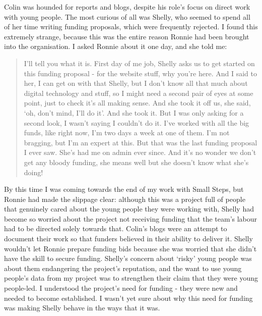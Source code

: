 Colin was hounded for reports and blogs, despite his role's focus on direct work with young people. The most curious of all was Shelly, who seemed to spend all of her time writing funding proposals, which were frequently rejected. I found this extremely strange, because this was the entire reason Ronnie had been brought into the organisation. I asked Ronnie about it one day, and she told me:
\begin{quote}
I'll tell you what it is. First day of me job, Shelly asks us to get started on this funding proposal - for the website stuff, why you're here. And I said to her, I can get on with that Shelly, but I don't know all that much about digital technology and stuff, so I might need a second pair of eyes at some point, just to check it's all making sense. And she took it off us, she said, `oh, don't mind, I'll do it'. And she took it. But I was only asking for a second look, I wasn't saying I couldn't do it. I've worked with all the big funds, like right now, I'm two days a week at one of them. I'm not bragging, but I'm an expert at this. But that was the last funding proposal I ever saw. She's had me on admin ever since. And it's no wonder we don't get any bloody funding, she means well but she doesn't know what she's doing!
\end{quote}

By this time I was coming towards the end of my work with Small Steps, but Ronnie had made the slippage clear: although this was a project full of people that genuinely cared about the young people they were working with, Shelly had become so worried about the project not receiving funding that the team's labour had to be directed solely towards that. Colin's blogs were an attempt to document their work so that funders believed in their ability to deliver it. Shelly wouldn't let Ronnie prepare funding bids because she was worried that she didn't have the skill to secure funding. Shelly's concern about `risky' young people was about them endangering the project's reputation, and the want to use young people's data from my project was to strengthen their claim that they were young people-led. I understood the project's need for funding - they were new and needed to become established. I wasn't yet sure about why this need for funding was making Shelly behave in the ways that it was.

